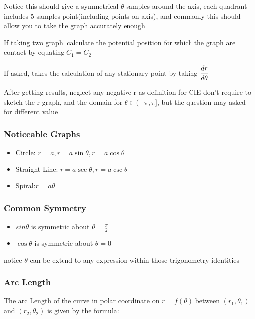 \documentclass[]{article}
\begin{document}
Notice this should give a symmetrical \(\theta\) samples around the
axis, each quadrant includes 5 samples point(including points on axis),
and commonly this should allow you to take the graph accurately enough

If taking two graph, calculate the potential position for which the
graph are contact by equating \(C_{1} = C_{2}\)

If asked, takes the calculation of any stationary point by taking
\(\cfrac{dr}{d\theta}\)

After getting results, neglect any negative r as definition for CIE
don't require to sketch the r graph, and the domain for
\(\theta \in (-\pi,\pi]\), but the question may asked for different
value

\subsubsection{Noticeable Graphs}\label{header-n990}

\begin{itemize}
\item
  Circle: \(r = a, r = a\sin\theta, r = a\cos\theta\)
\item
  Straight Line: \(r = a\sec\theta, r = a\csc\theta\)
\item
  Spiral:\(r = a\theta\)
\end{itemize}

\subsubsection{Common Symmetry}\label{header-n1001}

\begin{itemize}
\item
  \(sin\theta\) is symmetric about \(\theta = \frac{\pi}{2}\)
\item
  \(\cos\theta\) is symmetric about \(\theta = 0\)
\end{itemize}

notice \(\theta\) can be extend to any expression within those
trigonometry identities

\subsubsection{Arc Length}\label{header-n1011}

The arc Length of the curve in polar coordinate on \(r = f(\theta)\)
between \((r_1,\theta_1)\) and \((r_2,\theta_2)\) is given by the
formula:
\end{document}
